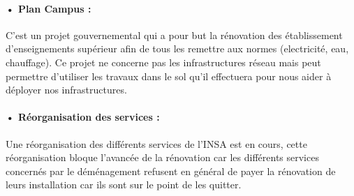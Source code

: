 \paragraph{• Plan Campus :} C'est un projet gouvernemental qui a pour but la rénovation des établissement d'enseignements supérieur afin de tous les remettre aux normes (electricité, eau, chauffage). Ce projet ne concerne pas les infrastructures réseau mais peut permettre d'utiliser les travaux dans le sol qu'il effectuera pour nous aider à déployer nos infrastructures.

\paragraph{• Réorganisation des services :} Une réorganisation des différents services de l'INSA est en cours, cette réorganisation bloque l'avancée de la rénovation car les différents services concernés par le déménagement refusent en général de payer la rénovation de leurs installation car ils sont sur le point de les quitter.



